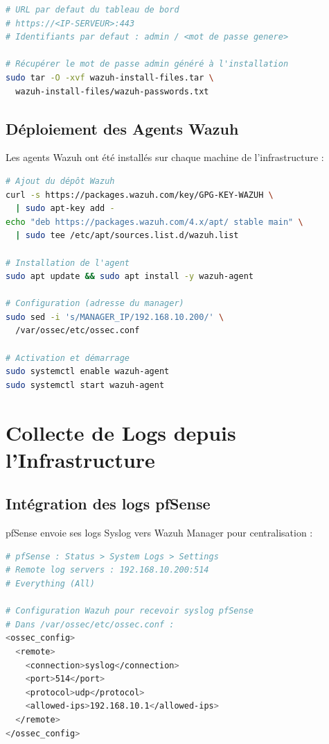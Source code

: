 \documentclass[12pt,a4paper,openany]{report}
\begin{document}
\begin{lstlisting}[language=bash, caption={Accès au tableau de bord Wazuh}]
# URL par defaut du tableau de bord
# https://<IP-SERVEUR>:443
# Identifiants par defaut : admin / <mot de passe genere>

# Récupérer le mot de passe admin généré à l'installation
sudo tar -O -xvf wazuh-install-files.tar \
  wazuh-install-files/wazuh-passwords.txt
\end{lstlisting}

\subsection{Déploiement des Agents Wazuh}

Les agents Wazuh ont été installés sur chaque machine de l'infrastructure :

\begin{lstlisting}[language=bash, caption={Installation de l'agent Wazuh sur Ubuntu DMZ}]
# Ajout du dépôt Wazuh
curl -s https://packages.wazuh.com/key/GPG-KEY-WAZUH \
  | sudo apt-key add -
echo "deb https://packages.wazuh.com/4.x/apt/ stable main" \
  | sudo tee /etc/apt/sources.list.d/wazuh.list

# Installation de l'agent
sudo apt update && sudo apt install -y wazuh-agent

# Configuration (adresse du manager)
sudo sed -i 's/MANAGER_IP/192.168.10.200/' \
  /var/ossec/etc/ossec.conf

# Activation et démarrage
sudo systemctl enable wazuh-agent
sudo systemctl start wazuh-agent
\end{lstlisting}

\section{Collecte de Logs depuis l'Infrastructure}

\subsection{Intégration des logs pfSense}

pfSense envoie ses logs Syslog vers Wazuh Manager pour centralisation :

\begin{lstlisting}[language=bash, caption={Configuration Syslog dans pfSense vers Wazuh}]
# pfSense : Status > System Logs > Settings
# Remote log servers : 192.168.10.200:514
# Everything (All)

# Configuration Wazuh pour recevoir syslog pfSense
# Dans /var/ossec/etc/ossec.conf :
<ossec_config>
  <remote>
    <connection>syslog</connection>
    <port>514</port>
    <protocol>udp</protocol>
    <allowed-ips>192.168.10.1</allowed-ips>
  </remote>
</ossec_config>
\end{lstlisting}
\end{document}
